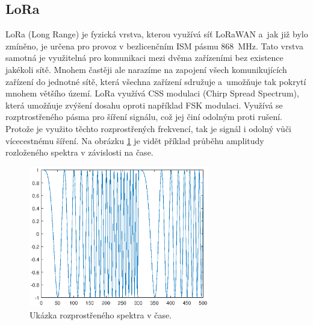 \subsection{LoRa}

LoRa (Long Range) je fyzická vrstva, kterou využívá síť LoRaWAN a~jak již bylo zmíněno, je určena pro provoz v bezlicenčním ISM pásmu \SI{868}{\mega\hertz}. Tato vrstva samotná je využitelná pro komunikaci mezi dvěma zařízeními bez existence jakékoli sítě. Mnohem častěji ale narazíme na zapojení všech komunikujících zařízení do jednotné sítě, která všechna zařízení sdružuje a~umožňuje tak pokrytí mnohem většího území. LoRa využívá CSS modulaci (Chirp Spread Spectrum), která umožňuje zvýšení dosahu oproti například FSK modulaci. Využívá se rozptrostřeného pásma pro šíření signálu, což jej činí odolným proti rušení. Protože je využito těchto rozprostřených frekvencí, tak je signál i odolný vůči vícecestnému šíření. Na obrázku \ref{fig_chirpSpreadSpectrum} je vidět příklad průběhu amplitudy rozloženého spektra v závislosti na čase.

\begin{figure}
    \centering
    \includegraphics[width=0.7\textwidth]{obrazky/ChirpSpreadSpectrum.eps}
    \caption{Ukázka rozprostřeného spektra v čase.}
    \label{fig_chirpSpreadSpectrum}
\end{figure}